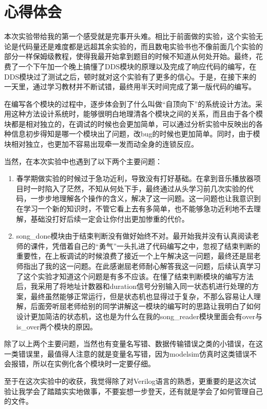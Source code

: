 \documentclass{../source/zjureport}
\begin{document}
\section{心得体会}
本次实验带给我的第一个感受就是完事开头难。相比于前面做的实验，这个实验无论是代码量还是难度都是远超其余实验的，而且数电实验书也不像前面几个实验的部分一样保姆级教程，使得我最开始拿到题目的时候不知道从何处开始。最终，花费了一个下午加一个晚上搞懂了DDS模块的原理以及完成了响应代码的编写，在DDS模块过了测试之后，顿时就对这个实验有了更多的信心。于是，在接下来的一天里，通过学习教材并不断试错，最终用半天时间完成了第一版代码的编写。


在编写各个模块的过程中，逐步体会到了什么叫做“自顶向下”的系统设计方法。采用这种方法设计系统时，能够很明白地理清各个模块之间的关系，而且由于各个模块都是相对独立的，在调试的时候也会更加简单，可以通过分析实验中反映出的各种信息初步得知是哪一个模块出了问题，改bug的时候也更加简单。同时，由于模块相对独立，也更加不容易出现牵一发而动全身的连锁反应。

当然，在本次实验中也遇到了以下两个主要问题：
\begin{enumerate}
    \item 春学期做实验的时候过于急功近利，导致没有打好基础。在拿到音乐播放器项目时一时陷入了茫然，不知从何处下手，最终通过从头学习前几次实验的代码，一步步地理解各个操作的含义，解决了这一问题。这一问题也让我意识到在学习一个新的知识时，不管它看上去有多简单，也不能够急功近利地不去理解，基础没打好后续一定会让你付出更加惨重的代价。
    \item song_done模块由于结束判断没有做好始终不对。最开始我并没有认真阅读老师的课件，凭借着自己的“勇气”一头扎进了代码编写之中，忽视了结束判断的重要性，在上板调试的时候浪费了接近一个上午解决这一问题，最终还是屈老师指出了我的这一问题。在此感谢屈老师耐心解答我这一问题，后续认真学习了这个实验才知道这个问题是有多不应该。在懂了结束判断模块的编写方法后，我采用了将地址计数器和duration信号分别输入同一状态机进行处理的方案，最终虽然能够正常运行，但是状态机也显得过于复杂，不那么容易让人理解，后面旁听屈老师给别的同学讲解这一模块的编写时的思路让我明白了如何设计更加简洁的状态机，这也是为什么在我的song_reader模块里面会有over与is_over两个模块的原因。
\end{enumerate}

除了以上两个主要问题，当然也有变量名写错、数据传输错误之类的小错误，在这一类错误里，最值得人注意的就是变量名写错，因为modelsim仿真时这类错误不会报错，所以在实例化各个模块时一定要仔细。

至于在这次实验中的收获，我觉得除了对Verilog语言的熟悉，更重要的是这次试验让我学会了踏踏实实地做事，不要妄想一步登天，还有就是学会了如何管理自己的文件。
\end{document}
